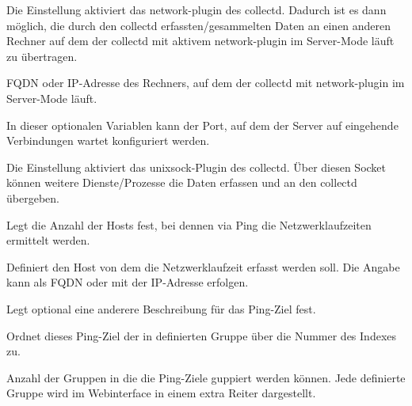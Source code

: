 \begin{description}

  Die Einstellung  aktiviert das network-plugin des collectd.
  Dadurch ist es dann möglich, die durch den collectd erfassten/gesammelten Daten
  an einen anderen Rechner auf dem der collectd mit aktivem network-plugin im
  Server-Mode läuft zu übertragen.
  

  FQDN oder IP-Adresse des Rechners, auf dem der collectd mit network-plugin im
  Server-Mode läuft.
  
  
  In dieser optionalen Variablen kann der Port, auf dem der Server auf eingehende 
  Verbindungen wartet konfiguriert werden.
  
  
  Die Einstellung  aktiviert das unixsock-Plugin des collectd.
  Über diesen Socket können weitere Dienste/Prozesse die Daten erfassen und an 
  den collectd übergeben.
  

  Legt die Anzahl der Hosts fest, bei dennen via Ping die Netzwerklaufzeiten
  ermittelt werden.
  
  
  Definiert den Host von dem die Netzwerklaufzeit erfasst werden soll.
  Die Angabe kann als FQDN oder mit der IP-Adresse erfolgen.
  

  Legt optional eine anderere Beschreibung für das Ping-Ziel fest. 
  

  Ordnet dieses Ping-Ziel der in  definierten 
  Gruppe über die Nummer des Indexes zu.
  
  
  Anzahl der Gruppen in die die Ping-Ziele guppiert werden können. Jede definierte
  Gruppe wird im Webinterface in einem extra Reiter dargestellt.
  


\end{description}
